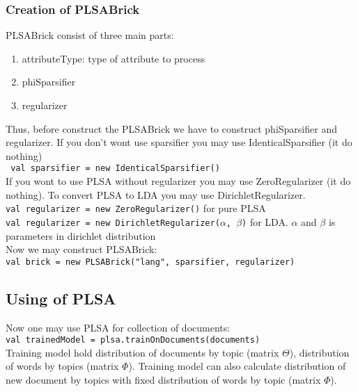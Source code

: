 \documentclass{article}
\begin{document}
            \subsubsection{Creation of PLSABrick}
                PLSABrick consist of three main parts:
                    \begin{enumerate}
                        \item attributeType: type of attribute to process
                        \item phiSparsifier
                        \item regularizer
                    \end{enumerate}
                Thus, before construct the PLSABrick we have to construct phiSparsifier and regularizer. 
                If you don't wont use sparsifier you may use IdenticalSparsifier (it do nothing)\\
                    \texttt{ val sparsifier = new IdenticalSparsifier() } \\
                If you wont to use PLSA without regularizer you may use ZeroRegularizer (it do nothing). To convert PLSA to LDA you may use DirichletRegularizer.
                    \\ \texttt{val regularizer = new ZeroRegularizer()}  for pure PLSA 
                    \\ \texttt{val regularizer = new DirichletRegularizer($\alpha$, $\beta$)}  for LDA.  $\alpha$ and $\beta$ is parameters in dirichlet distribution \\
                
                Now we may construct PLSABrick:
                    \\ \texttt{val brick = new PLSABrick("lang", sparsifier, regularizer) } \\

        \subsection{Using of PLSA}
            Now one may use PLSA for collection of documents:
                \\ \texttt{val trainedModel = plsa.trainOnDocuments(documents) }  \\
                Training model hold distribution of documents by topic (matrix $\Theta$), distribution of words by topics (matrix $\Phi$). Training model can also
                calculate distribution of new document by topics with fixed distribution of words by topic (matrix $\Phi$).

 
\end{document}
